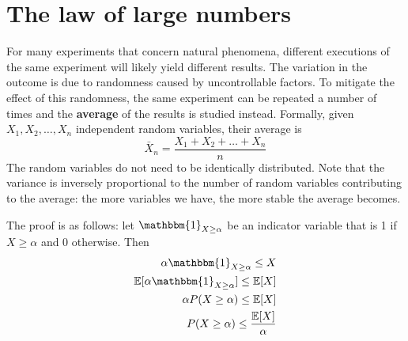 \section*{The law of large numbers}

For many experiments that concern natural phenomena, different executions of the same experiment will likely yield different results. The variation in the outcome is due to randomness caused by uncontrollable factors. To mitigate the effect of this randomness, the same experiment can be repeated a number of times and the \textbf{average} of the results is studied instead. Formally, given $X_1, X_2, \dots, X_n$ independent random variables, their average is
\begin{equation*}
    \bar{X}_n = \frac{X_1 + X_2 + \ldots + X_n}{n}
\end{equation*}
The random variables do not need to be identically distributed. Note that the variance is inversely proportional to the number of random variables contributing to the average: the more variables we have, the more stable the average becomes.

The proof is as follows: let $\mathbbm{1}_{X \geq \alpha}$ be an indicator variable that is 1 if $X \geq \alpha$ and 0 otherwise. Then
\begin{align*}
    \alpha \mathbbm{1}_{X \geq \alpha} \leq X\\
    \E[\alpha \mathbbm{1}_{X \geq \alpha}] \leq \E[X]\\
    \alpha P(X \geq \alpha) \leq \E[X]\\
    P(X \geq \alpha) \leq \frac{\E[X]}{\alpha}
\end{align*}

